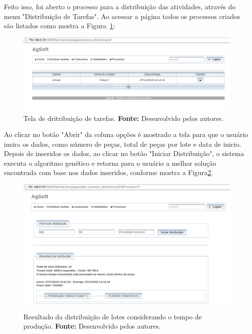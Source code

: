 \par Feito isso, foi aberto o processo para a distribuição
das atividades, através do menu "Distribuição de Tarefas".
Ao acessar a página todos os processos criados são
listados como mostra a Figura~\ref{fig:distribuicao_tarefas}:

\begin{figure}[h!]
	\centerline{\includegraphics[scale=0.3]{./imagens/tela_distribuicao_tarefas.png}}
	\caption[Tela de distribuição de tarefas.]
	{Tela de dritribuição de tarefas. \textbf{Fonte:} Desenvolvido
	pelos autores.}
	\label{fig:distribuicao_tarefas}
\end{figure}


\par Ao clicar no botão "Abrir" da coluna opções é mostrado a tela para que o
usuário insira os dados, como número de peças, total de peças por lote e data de inicio. Depois de
inseridos os dados, ao clicar no botão "Iniciar Distribuição", o sistema executa
o algoritmo genético e retorna para o usuário a melhor solução
encontrada com base nos dados inseridos, conforme mostra a Figura\ref{fig:resultado_distribuicao_teste1}.

\newpage

\begin{figure}[h!]
	\centerline{\includegraphics[scale=0.3]{./imagens/resultado_distribuicao_teste1.png}}
	\caption[Resultado da distribuição de lotes considerando o tempo de produção.]
	{Resultado da distribuição de lotes considerando o tempo de produção. \textbf{Fonte:} Desenvolvido pelos
	autores.}
	\label{fig:resultado_distribuicao_teste1}
\end{figure}

